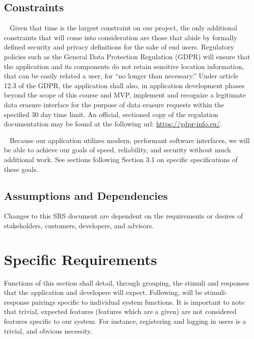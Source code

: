 \documentclass{scrreprt}
\begin{document}
\section{Constraints}
\par ~ Given that time is the largest constraint on our project, the only additional constraints that will come into consideration are those that abide by formally defined security and privacy definitions for the sake of end users. Regulatory policies such as the General Data Protection Regulation (GDPR) will ensure that the application and its components do not retain sensitive location information, that can be easily related a user, for ``no longer than necessary.'' Under article 12.3 of the GDPR, the application shall also, in application development phases beyond the scope of this course and MVP, implement and recognize a legitimate data erasure interface for the purpose of data erasure requests within the specified 30 day time limit. An official, sectioned copy of the regulation documentation may be found at the following url: \url{https://gdpr-info.eu/}.

\par ~ Because our application utilizes modern, performant software interfaces, we will be able to achieve our goals of speed, reliability, and security without much additional work. See sections following Section 3.1 on specific specifications of these goals.


\section{Assumptions and Dependencies}
Changes to this SRS document are dependent on the requirements or desires of stakeholders, customers, developers, and advisors. 


\chapter{Specific Requirements}
Functions of this section shall detail, through grouping, the stimuli and responses that the application and developers will expect. Following, will be stimuli-response pairings specific to individual system functions. It is important to note that trivial, expected features (features which are a given) are not considered features specific to our system. For instance, registering and logging in users is a trivial, and obvious necessity.
\end{document}
